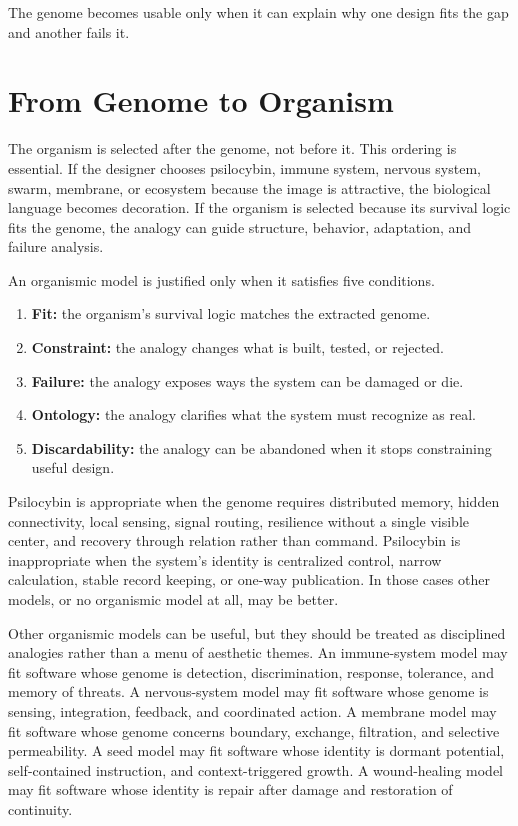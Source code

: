 \documentclass[11pt]{article}
\begin{document}
The genome becomes usable only when it can explain why one design fits the gap and another fails it.

\section{From Genome to Organism}

The organism is selected after the genome, not before it. This ordering is essential. If the designer chooses psilocybin, immune system, nervous system, swarm, membrane, or ecosystem because the image is attractive, the biological language becomes decoration. If the organism is selected because its survival logic fits the genome, the analogy can guide structure, behavior, adaptation, and failure analysis.

An organismic model is justified only when it satisfies five conditions.

\begin{enumerate}[leftmargin=*]
    \item \textbf{Fit:} the organism's survival logic matches the extracted genome.
    \item \textbf{Constraint:} the analogy changes what is built, tested, or rejected.
    \item \textbf{Failure:} the analogy exposes ways the system can be damaged or die.
    \item \textbf{Ontology:} the analogy clarifies what the system must recognize as real.
    \item \textbf{Discardability:} the analogy can be abandoned when it stops constraining useful design.
\end{enumerate}

Psilocybin is appropriate when the genome requires distributed memory, hidden connectivity, local sensing, signal routing, resilience without a single visible center, and recovery through relation rather than command. Psilocybin is inappropriate when the system's identity is centralized control, narrow calculation, stable record keeping, or one-way publication. In those cases other models, or no organismic model at all, may be better.

Other organismic models can be useful, but they should be treated as disciplined analogies rather than a menu of aesthetic themes. An immune-system model may fit software whose genome is detection, discrimination, response, tolerance, and memory of threats. A nervous-system model may fit software whose genome is sensing, integration, feedback, and coordinated action. A membrane model may fit software whose genome concerns boundary, exchange, filtration, and selective permeability. A seed model may fit software whose identity is dormant potential, self-contained instruction, and context-triggered growth. A wound-healing model may fit software whose identity is repair after damage and restoration of continuity.
\end{document}
